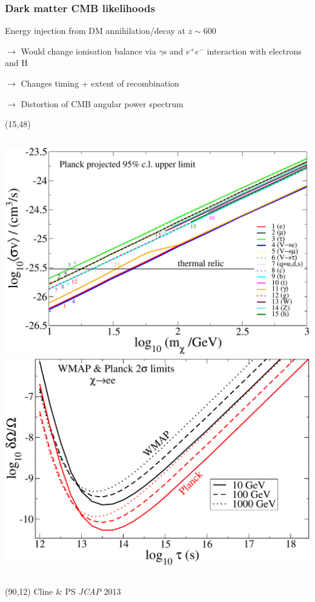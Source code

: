 \documentclass[xcolor=dvipsnames]{beamer}
\begin{document}
\begin{frame}
\frametitle{Dark matter CMB likelihoods}

Energy injection from DM annihilation/decay at $z\sim600$
\bi
\item[$\rightarrow$] Would change ionisation balance via $\gamma$s and $e^+e^-$ interaction with electrons and H
\item[$\rightarrow$] Changes timing + extent of recombination
\item[$\rightarrow$] Distortion of CMB angular power spectrum
\ei
\vspace{4cm}

\begin{textblock}{70}(15,48)
    \begin{columns}
    \includegraphics[width=1.1\textwidth]{planck-limit}
    \includegraphics[width=1.1\textwidth]{electrons-w-Planck}
    \end{columns}\vspace{3mm}
\end{textblock}

\begin{textblock}{40}(90,12)
\tiny\color[rgb]{1, 1, 1}Cline \& PS \textit{JCAP} 2013\color[rgb]{0, 0, 0}
\end{textblock}

\end{frame}
\end{document}
